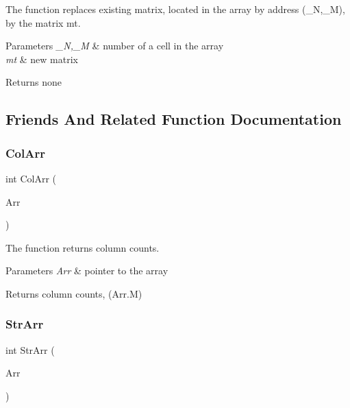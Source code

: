 The function replaces existing matrix, located in the array by address (\+\_\+N,\+\_\+M), by the matrix mt. 


\begin{DoxyParams}{Parameters}
{\em \+\_\+N,\+\_\+M} & number of a cell in the array \\
\hline
{\em mt} & new matrix \\
\hline
\end{DoxyParams}
\begin{DoxyReturn}{Returns}
none 
\end{DoxyReturn}


\subsection{Friends And Related Function Documentation}
\mbox{\label{class_arr2_d_c_a5e4430d3d9e09293206b128454ff38d4}} 
\subsubsection{\texorpdfstring{Col\+Arr}{ColArr}}
{\footnotesize\ttfamily int Col\+Arr (\begin{DoxyParamCaption}\item[{const \mbox{\hyperlink{class_arr2_d_c}{Arr2\+DC}} \&}]{Arr }\end{DoxyParamCaption})\hspace{0.3cm}{\ttfamily [friend]}}



The function returns column counts. 


\begin{DoxyParams}{Parameters}
{\em Arr} & pointer to the array \\
\hline
\end{DoxyParams}
\begin{DoxyReturn}{Returns}
column counts, (Arr.\+M) 
\end{DoxyReturn}
\mbox{\label{class_arr2_d_c_ac686d532a33928dd85ffeaa6000cd23c}} 
\subsubsection{\texorpdfstring{Str\+Arr}{StrArr}}
{\footnotesize\ttfamily int Str\+Arr (\begin{DoxyParamCaption}\item[{const \mbox{\hyperlink{class_arr2_d_c}{Arr2\+DC}} \&}]{Arr }\end{DoxyParamCaption})\hspace{0.3cm}{\ttfamily [friend]}}



